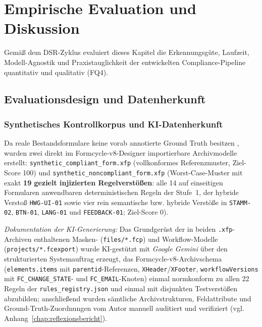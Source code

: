\chapter{Empirische Evaluation und Diskussion}
\label{chap:evaluation}

Gemäß dem DSR-Zyklus \parencite{hevner2004design, peffers2007design} evaluiert dieses Kapitel die Erkennungsgüte, Laufzeit, Modell-Agnostik und Praxistauglichkeit der entwickelten Compliance-Pipeline quantitativ und qualitativ (FQ4).

\section{Evaluationsdesign und Datenherkunft}
\label{sec:eval_design}

\subsection{Synthetisches Kontrollkorpus und KI-Datenherkunft}
Da reale Bestandsformulare keine vorab annotierte Ground Truth besitzen \parencite{zhong2025synthetic, guerino2025gpt4o}, wurden zwei direkt im Formcycle-v8-Designer importierbare Archivmodelle erstellt: \texttt{synthetic\_compliant\_form.xfp} (vollkonformes Referenzmuster, Ziel-Score 100) und \texttt{synthetic\_noncompliant\_form.xfp} (Worst-Case-Muster mit exakt \textbf{19 gezielt injizierten Regelverstößen}: alle 14 auf einseitigen Formularen anwendbaren deterministischen Regeln der Stufe~1, der hybride Verstoß \texttt{HWG-UI-01} sowie vier rein semantische bzw. hybride Verstöße in \texttt{STAMM-02}, \texttt{BTN-01}, \texttt{LANG-01} und \texttt{FEEDBACK-01}; Ziel-Score 0).

\textit{Dokumentation der KI-Generierung:} Das Grundgerüst der in beiden \texttt{.xfp}-Archiven enthaltenen Masken- (\texttt{files/*.fcp}) und Workflow-Modelle (\texttt{projects/*.fcexport}) wurde KI-gestützt mit \textit{Google Gemini} über den strukturierten Systemauftrag erzeugt, das Formcycle-v8-Archivschema (\texttt{elements.items} mit \texttt{parentid}-Referenzen, \texttt{XHeader}/\texttt{XFooter}, \texttt{workflowVersions} mit \texttt{FC\_CHANGE\_STATE}- und \texttt{FC\_EMAIL}-Knoten) einmal normkonform zu allen 22 Regeln der \texttt{rules\_registry.json} und einmal mit disjunkten Testverstößen abzubilden; anschließend wurden sämtliche Archivstrukturen, Feldattribute und Ground-Truth-Zuordnungen vom Autor manuell auditiert und verifiziert (vgl. Anhang~\ref{chap:reflexionsbericht}).


